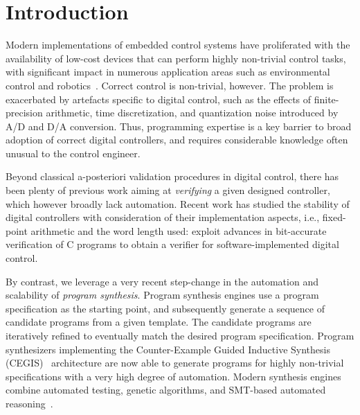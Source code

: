 \documentclass[final]{sig-alternate-05-2015}
\begin{document}
%
%
\printccsdesc



\section{Introduction}

Modern implementations of embedded control systems have proliferated with the
availability of low-cost devices that can perform highly non-trivial control
tasks, with significant impact in numerous application areas such as
environmental control and robotics~\cite{astrom1997computer, Franklin15}. 
Correct control is non-trivial, however. The problem is exacerbated by
artefacts specific to digital control, such as the effects of
finite-precision arithmetic, time discretization, and quantization noise
introduced by A/D and D/A conversion.  Thus, programming expertise is a key 
barrier to broad adoption of correct digital controllers, and requires considerable
knowledge often unusual to the control engineer.  

Beyond classical a-posteriori validation procedures in digital control,
there has been plenty of previous work aiming at \emph{verifying} a given 
designed controller, which however broadly lack automation.  
Recent work has studied the stability of digital controllers with consideration of their implementation aspects, i.e.,
fixed-point arithmetic and the word length used: 
\cite{Bessa16} exploit advances in bit-accurate verification of C
programs to obtain a verifier for software-implemented digital control.

By contrast, we leverage a very recent step-change in the automation and scalability of 
\emph{program synthesis}.  Program synthesis engines use a program
specification as the starting point, and subsequently generate a sequence of
candidate programs from a given template.  
The candidate programs are iteratively refined to eventually match the desired program specification.   
Program synthesizers implementing the 
Counter-Example Guided Inductive Synthesis (CEGIS)~\cite{sketch} architecture are now
able to generate programs for highly non-trivial specifications with a very 
high degree of automation.  Modern synthesis engines combine automated testing, 
genetic algorithms, 
and SMT-based automated reasoning~\cite{DBLP:journals/corr/AlurFSS16a,DBLP:conf/lpar/DavidKL15}.
\end{document}
